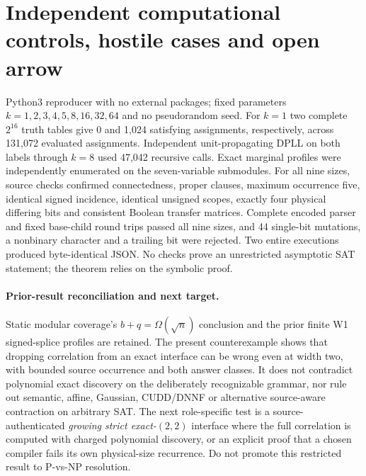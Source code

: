 \documentclass[11pt]{article}
\begin{document}
\section{Independent computational controls, hostile cases and open arrow}
Python3 reproducer  with no external packages; fixed parameters $k=1,2,3,4,5,8,16,32,64$ and no pseudorandom seed. For $k=1$ two complete $2^{16}$ truth tables give 0 and 1,024 satisfying assignments, respectively, across 131,072 evaluated assignments. Independent unit-propagating DPLL on both labels through $k=8$ used 47,042 recursive calls. Exact marginal profiles were independently enumerated on the seven-variable submodules. For all nine sizes, source checks confirmed connectedness, proper clauses, maximum occurrence five, identical signed incidence, identical unsigned scopes, exactly four physical differing bits and consistent Boolean transfer matrices. Complete encoded parser and fixed base-child round trips passed all nine sizes, and 44 single-bit mutations, a nonbinary character and a trailing bit were rejected. Two entire executions produced byte-identical JSON. No checks prove an unrestricted asymptotic SAT statement; the theorem relies on the symbolic proof.

\paragraph{Prior-result reconciliation and next target.} Static modular coverage's $b+q=\Omega(\sqrt n)$ conclusion and the prior finite W1 signed-splice profiles are retained. The present counterexample shows that dropping correlation from an exact interface can be wrong even at width two, with bounded source occurrence and both answer classes. It does not contradict polynomial exact discovery on the deliberately recognizable grammar, nor rule out semantic, affine, Gaussian, CUDD/DNNF or alternative source-aware contraction on arbitrary SAT. The next role-specific test is a source-authenticated \emph{growing strict exact-$(2,2)$} interface where the full correlation is computed with charged polynomial discovery, or an explicit proof that a chosen compiler fails its own physical-size recurrence. Do not promote this restricted result to P-vs-NP resolution.



\end{document}
